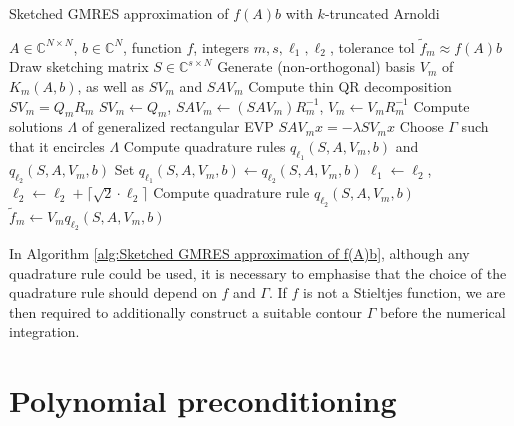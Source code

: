 \flushbottom
\begin{algorithm}[H]
    \caption{Sketched GMRES approximation of $f(A)b$ with $k$-truncated Arnoldi \cite{41}}
    \label{alg:Sketched GMRES approximation of f(A)b}
    \begin{algorithmic}[1]
        \REQUIRE $A \in \mathbb{C}^{N \times N}$, $b \in \mathbb{C}^{N}$, function $f$, integers $m, s, \ell_1, \ell_2$, tolerance $\text{tol}$
        \ENSURE $\tilde{f}_m \approx f(A)b$
        \STATE Draw sketching matrix $S \in \mathbb{C}^{s \times N}$
        \STATE Generate (non-orthogonal) basis $V_m$ of $K_m(A, b)$, as well as $SV_m$ and $SAV_m$
        \STATE Compute thin QR decomposition $SV_m = Q_mR_m$ 
        \STATE $SV_m \gets Q_m$, $SAV_m \gets (SAV_m)R_m^{-1}$, $V_m \gets V_mR_m^{-1}$ 
            \STATE Compute solutions $\Lambda$ of generalized rectangular EVP $SAV_m x = -\lambda SV_m x$
            \STATE Choose $\Gamma$ such that it encircles $\Lambda$
        \ENDIF
        \STATE Compute quadrature rules $q_{\ell_1}(S, A, V_m, b)$ and $q_{\ell_2}(S, A, V_m, b)$ 
            \STATE Set $q_{\ell_1}(S, A, V_m, b) \gets q_{\ell_2}(S, A, V_m, b)$ 
            \STATE $\ell_1 \gets \ell_2$, $\ell_2 \gets \ell_2 + \lceil \sqrt{2} \cdot \ell_2 \rceil$ 
            \STATE Compute quadrature rule $q_{\ell_2}(S, A, V_m, b)$
        \ENDWHILE
        \STATE $\tilde{f}_m \gets V_m q_{\ell_2}(S, A, V_m, b)$
    \end{algorithmic}
\end{algorithm}


In Algorithm \ref{alg:Sketched GMRES approximation of f(A)b}, although any quadrature rule could be used, it is necessary to emphasise that the choice of the quadrature rule should depend on $f$ and $\Gamma$. If $f$ is not a Stieltjes function, we are then required to additionally construct a suitable contour $\Gamma$ before the numerical integration.


\section{Polynomial preconditioning} 
\label{sec:poly_pre_cond}


